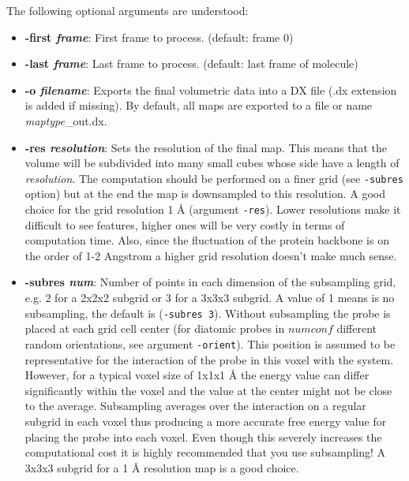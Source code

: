 The following optional arguments are understood:
\begin{itemize} 
  \item {\bf -first {\it frame}}: First frame to process. (default: frame 0)

  \item {\bf -last {\it frame}}: Last frame to process.
    (default: last frame of molecule)

  \item {\bf -o {\it filename}}: Exports the final volumetric data into a DX
    file (.dx extension is added if missing). By default, all maps are exported to
    a file or name {\it maptype}\_out.dx.

  \item {\bf -res {\it resolution}}: Sets the resolution of the final map.
    This means that the volume will be subdivided into many small cubes
    whose side have a length of {\it resolution}. The computation should
    be performed on a finer grid (see {\tt -subres} option) but at the end
    the map is downsampled to this resolution.
    A good choice for the grid resolution 1 {\AA} (argument {\tt -res}). 
    Lower resolutions make it difficult to see features, higher ones will
    be very costly in terms of computation time. Also, since the fluctuation
    of the protein backbone is on the order of 1-2 Angstrom a higher grid 
    resolution doesn't make much sense.

  \item {\bf -subres {\it num}}: Number of points in each dimension of the
    subsampling grid, e.g. 2 for a 2x2x2 subgrid or 3 for a 3x3x3 subgrid.
    A value of 1 means is no subsampling, the default is ({\tt -subres 3}). 
    Without subsampling the probe is placed at each grid cell
    center (for diatomic probes in $numconf$ different random orientations, 
    see argument {\tt -orient}). This position is assumed to be representative
    for the interaction of the probe in this voxel with the system.
    However, for a typical voxel size of 1x1x1 {\AA} the energy value can
    differ significantly within the voxel and the value at the center might
    not be close to the average. Subsampling averages over the interaction
    on a regular subgrid in each voxel thus producing a more accurate free
    energy value for placing the probe into each voxel. Even though this
    severely increases the computational cost it is highly recommended that
    you use subsampling!
    A 3x3x3 subgrid for a 1 {\AA} resolution map is a good choice.


\end{itemize}
